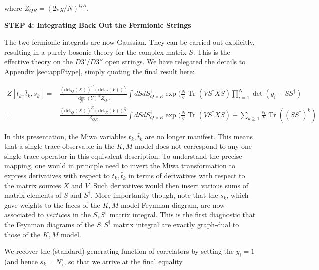 \documentclass[english]{article}
\DeclareMathOperator{\Tr}{Tr}
\renewcommand{\>}{\rangle}
\newcommand{\<}{\langle}
\renewcommand{\(}{\left(}
\renewcommand{\)}{\right)}
\begin{document}
where $Z_{QR}= (2\pi g/N)^{QR}$.

\textbf{STEP 4: Integrating Back Out the Fermionic Strings}

The two fermionic integrals are now Gaussian. They can be carried out explicitly, resulting in a purely bosonic theory for the complex matrix $S$. This is the effective theory on the $D3'/D3''$ open strings. We have relegated the details to Appendix \ref{sec:appFtype}, simply quoting the final result here:


\begin{align} \label{eq:Fmodel}
  Z[t_{k},\bar{t}_{k},s_{k}] = &  \frac{(\text{det}_Q(X))^{R}(\text{det}_{R}(V))^{Q}}{\det_{N}(Y)^{N} Z_{QR}} \int dS dS^{\dagger}_{Q \times R} \exp(\frac{N}{g}\Tr(V S^{\dagger} X S) \prod_{i=1}^{N} \det(y_{i}-SS^{\dagger})\\
  = & \frac{(\text{det}_Q(X))^{R}(\text{det}_{R}(V))^{Q}}{Z_{QR}} \int dS dS^{\dagger}_{Q \times R} \exp(\frac{N}{g}\Tr(V S^{\dagger} X S) + \sum_{k\geq 1}  \frac{s_{k}}{k} \Tr((S S^{\dagger})^k)
\end{align}

In this presentation, the Miwa variables $t_{k}, \bar{t}_{k}$ are no longer manifest. This means that a single trace observable in the $K,M$ model does not correspond to any one single trace operator in this equivalent description. To understand the precise mapping, one would in principle need to invert the Miwa transformation to express derivatives with respect to $t_{k}, \bar{t}_{k}$ in terms of derivatives with respect to the matrix sources $X$ and $V$. Such derivatives would then insert various sums of matrix elements of $S$ and $S^{\dagger}$. More importantly though, note that the $s_{k}$, which gave weights to the faces of the $K,M$ model Feynman diagram, are now associated to $\textit{vertices}$ in the $S,S^{\dagger}$ matrix integral. This is the first diagnostic that the Feynman diagrams of the $S,S^{\dagger}$ matrix integral are exactly graph-dual to those of the $K,M$ model. 

We recover the (standard) generating function of correlators by setting the $y_{i}=1$ (and hence $s_{k}=N$), so that we arrive at the final equality
\end{document}
